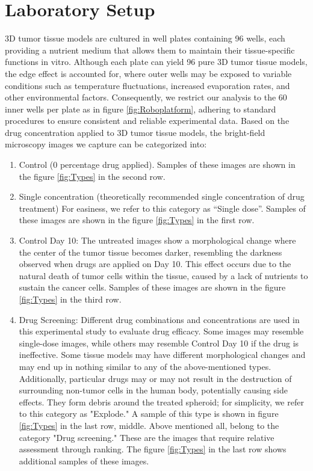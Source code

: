\section{Laboratory Setup}
\label{sec:lab-setup}
3D tumor tissue models are cultured in well plates containing 96 wells, each providing a nutrient medium that allows them to maintain their tissue-specific functions in vitro. Although each plate can yield 96 pure 3D tumor tissue models, the edge effect is accounted for, where outer wells may be exposed to variable conditions such as temperature fluctuations, increased evaporation rates, and other environmental factors. Consequently, we restrict our analysis to the 60 inner wells per plate as in figure \ref{fig:Roboplatform}, adhering to standard procedures to ensure consistent and reliable experimental data. Based on the drug concentration applied to 3D tumor tissue models, the bright-field microscopy images we capture can be categorized into:

\begin{enumerate}[itemsep=0.5em, parsep=0pt] %
  \item Control (0 percentage drug applied). Samples of these images are shown in the figure \ref{fig:Types} in the second row.
  \item Single concentration (theoretically recommended single concentration of drug treatment) For easiness, we refer to this category as ``Single dose''. Samples of these images are shown in the figure \ref{fig:Types} in the first row.
  \item Control Day 10: The untreated images show a morphological change where the center of the tumor tissue becomes darker, resembling the darkness observed when drugs are applied on Day 10. This effect occurs due to the natural death of tumor cells within the tissue, caused by a lack of nutrients to sustain the cancer cells. Samples of these images are shown in the figure \ref{fig:Types} in the third row.
  \item Drug Screening: Different drug combinations and concentrations are used in this experimental study to evaluate drug efficacy. Some images may resemble single-dose images, while others may resemble Control Day 10 if the drug is ineffective. Some tissue models may have different morphological changes and may end up in nothing similar to any of the above-mentioned types. Additionally, particular drugs may or may not result in the destruction of surrounding non-tumor cells in the human body, potentially causing side effects. They form debris around the treated spheroid; for simplicity, we refer to this category as "Explode." A sample of this type is shown in figure \ref{fig:Types} in the last row, middle. Above mentioned all, belong to the category "Drug screening." These are the images that require relative assessment through ranking. The figure \ref{fig:Types} in the last row shows additional samples of these images.
\end{enumerate}


